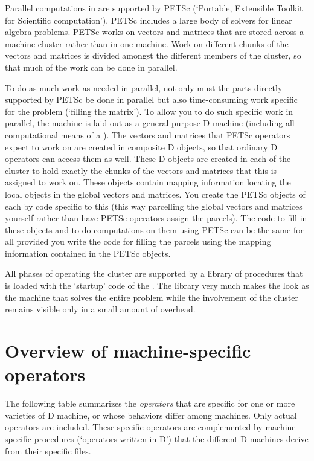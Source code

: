 Parallel computations in  are supported by PETSc
(`Portable, Extensible Toolkit for Scientific computation'). PETSc
includes a large body of solvers for linear algebra problems. PETSc
works on vectors and matrices that are stored across a machine cluster
rather than in one machine. Work on different chunks of the vectors
and matrices is divided amongst the different members of the cluster,
so that much of the work can be done in parallel.

To do as much work as needed in parallel, not only must the parts
directly supported by PETSc be done in parallel but also
time-consuming work specific for the problem (`filling the
matrix'). To allow you to do such specific work in parallel, the
 machine is laid out as a general purpose D machine
(including all computational means of a ). The vectors
and matrices that PETSc operators expect to work on are created in
composite D objects, so that ordinary D operators can access them as
well. These D objects are created in each  of the cluster
to hold exactly the chunks of the vectors and matrices that this
 is assigned to work on. These objects contain mapping
information locating the local objects in the global vectors and
matrices. You create the PETSc objects of each  by code
specific to this  (this way parcelling the global vectors
and matrices yourself rather than have PETSc operators assign the
parcels). The code to fill in these objects and to do computations on
them using PETSc can be the same for all 
provided you write the code for filling the parcels using the mapping
information contained in the PETSc objects.

All phases of operating the  cluster are supported by a
library of procedures that is loaded with the `startup' code of the
. The library very much makes the  look as the
machine that solves the entire problem while the involvement of the
 cluster remains visible only in a small amount of
overhead.

\section{Overview of machine-specific operators}

The following table summarizes the \emph{operators} that are specific
for one or more varieties of D machine, or whose behaviors differ
among machines. Only actual operators are included. These specific
operators are complemented by machine-specific procedures (`operators
written in D') that the different D machines derive from their
specific  files.

